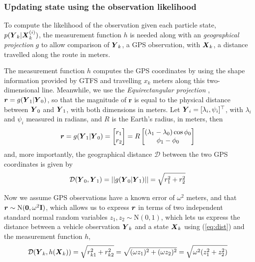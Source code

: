 \afterpage{\clearpage}


\subsubsection{Updating state using the observation likelihood}
\label{sec:pf_update}

To compute the likelihood of the observation given each particle state,
$p(\mbox{$\boldsymbol{Y}$}_k|\mbox{$\boldsymbol{X}$}_k^{(i)})$,
the measurement function $h$ is needed along with an
\emph{geographical projection} $g$ to allow comparison of $\mbox{$\boldsymbol{Y}$}_k$,
a GPS observation, with $\mbox{$\boldsymbol{X}$}_k$, a distance travelled along the route in meters.

The measurement function $h$ computes the GPS coordinates by using the 
shape information provided by GTFS and travelling $x_k$ meters along 
this two-dimensional line.
Meanwhile, we use the \emph{Equirectangular projection} \citep{Snyder_1998},
$\boldsymbol{r} = g(\mbox{$\boldsymbol{Y}$}_1 | \mbox{$\boldsymbol{Y}$}_0)$,
so that the magnitude of $\boldsymbol{r}$ is equal to the physical distance
between $\mbox{$\boldsymbol{Y}$}_0$ and $\mbox{$\boldsymbol{Y}$}_1$, with both dimensions in meters.
Let $\mbox{$\boldsymbol{Y}$}_i = [\lambda_i, \psi_i]^\top$,
with $\lambda_i$ and $\psi_i$ measured in radians,  
and $R$ is the Earth's radius, in meters, then
\begin{equation}
\boldsymbol{r} = 
g(\mbox{$\boldsymbol{Y}$}_1 | \mbox{$\boldsymbol{Y}$}_0) = 
    \begin{bmatrix}
        r_1 \\ r_2
    \end{bmatrix} =
    R \begin{bmatrix}
        (\lambda_1 - \lambda_0)\cos\phi_0 \\
        \phi_1 - \phi_0
    \end{bmatrix}
\end{equation}
and, more importantly, the geographical distance $\mathcal{D}$ between the two 
GPS coordinates is given by
\begin{equation}
\label{eq:dist}
\mathcal{D}(\mbox{$\boldsymbol{Y}$}_0, \mbox{$\boldsymbol{Y}$}_1) = ||g(\mbox{$\boldsymbol{Y}$}_0 | \mbox{$\boldsymbol{Y}$}_1)|| = \sqrt{r_1^2 + r_2^2}
\end{equation}


Now we assume GPS observations have a known error of $\omega^2$ meters,
and that \mbox{$\boldsymbol{r} \sim \mathrm{N}(\boldsymbol{0}, \omega^2\mathbf{I})$},
which allows us to express $\boldsymbol{r}$ in terms of two independent
standard normal random variables $z_1, z_2 \sim \mathrm{N}(0,1)$,
which lets us express the distance between a vehicle observation $\mbox{$\boldsymbol{Y}$}_k$
and a state $\mbox{$\boldsymbol{X}$}_k$ using (\ref{eq:dist}) and the measurement function $h$,
\begin{equation}
\label{eq:obs_dist}
\mathcal{D}(\mbox{$\boldsymbol{Y}$}_k, h(\mbox{$\boldsymbol{X}$}_k)) = \sqrt{r_{k1}^2 + r_{k2}^2} 
    = \sqrt{(\omega z_1)^2 + (\omega z_2)^2}
    = \sqrt{\omega^2 (z_1^2 + z_2^2)}
\end{equation}

